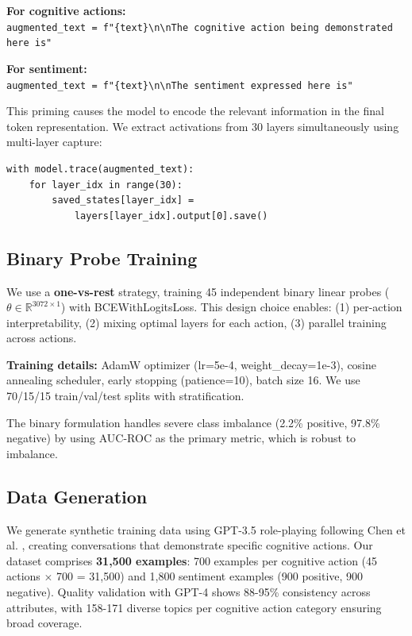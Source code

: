 \documentclass[letterpaper]{article}
\begin{document}
\textbf{For cognitive actions:}\\
\texttt{augmented\_text = f"\{text\}\textbackslash n\textbackslash nThe cognitive action being demonstrated here is"}

\textbf{For sentiment:}\\
\texttt{augmented\_text = f"\{text\}\textbackslash n\textbackslash nThe sentiment expressed here is"}

This priming causes the model to encode the relevant information in the final token representation. We extract activations from 30 layers simultaneously using multi-layer capture:

\begin{small}
\begin{verbatim}
with model.trace(augmented_text):
    for layer_idx in range(30):
        saved_states[layer_idx] =
            layers[layer_idx].output[0].save()
\end{verbatim}
\end{small}

\subsection{Binary Probe Training}

We use a \textbf{one-vs-rest} strategy, training 45 independent binary linear probes ($\theta \in \mathbb{R}^{3072 \times 1}$) with BCEWithLogitsLoss. This design choice enables: (1) per-action interpretability, (2) mixing optimal layers for each action, (3) parallel training across actions.

\textbf{Training details:} AdamW optimizer (lr=5e-4, weight\_decay=1e-3), cosine annealing scheduler, early stopping (patience=10), batch size 16. We use 70/15/15 train/val/test splits with stratification.

The binary formulation handles severe class imbalance (2.2\% positive, 97.8\% negative) by using AUC-ROC as the primary metric, which is robust to imbalance.

\subsection{Data Generation}

We generate synthetic training data using GPT-3.5 role-playing following Chen et al. \cite{chen2024designing}, creating conversations that demonstrate specific cognitive actions. Our dataset comprises \textbf{31,500 examples}: 700 examples per cognitive action (45 actions $\times$ 700 = 31,500) and 1,800 sentiment examples (900 positive, 900 negative). Quality validation with GPT-4 shows 88-95\% consistency across attributes, with 158-171 diverse topics per cognitive action category ensuring broad coverage.
\end{document}
